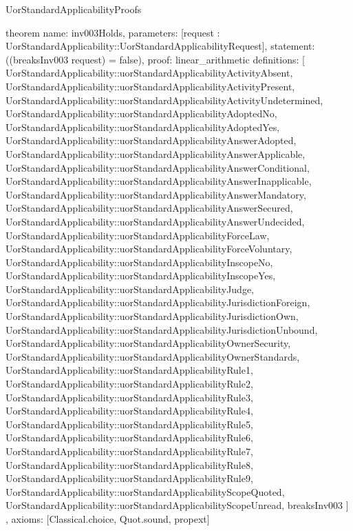 \begin{lexlean}{UorStandardApplicabilityProofs}
\begin{semanticmodule}
theorem{
  name: inv003Holds,
  parameters: [request : UorStandardApplicability::UorStandardApplicabilityRequest],
  statement: ((breaksInv003 request) = false),
  proof: linear_arithmetic{
    definitions: [
      UorStandardApplicability::uorStandardApplicabilityActivityAbsent,
      UorStandardApplicability::uorStandardApplicabilityActivityPresent,
      UorStandardApplicability::uorStandardApplicabilityActivityUndetermined,
      UorStandardApplicability::uorStandardApplicabilityAdoptedNo,
      UorStandardApplicability::uorStandardApplicabilityAdoptedYes,
      UorStandardApplicability::uorStandardApplicabilityAnswerAdopted,
      UorStandardApplicability::uorStandardApplicabilityAnswerApplicable,
      UorStandardApplicability::uorStandardApplicabilityAnswerConditional,
      UorStandardApplicability::uorStandardApplicabilityAnswerInapplicable,
      UorStandardApplicability::uorStandardApplicabilityAnswerMandatory,
      UorStandardApplicability::uorStandardApplicabilityAnswerSecured,
      UorStandardApplicability::uorStandardApplicabilityAnswerUndecided,
      UorStandardApplicability::uorStandardApplicabilityForceLaw,
      UorStandardApplicability::uorStandardApplicabilityForceVoluntary,
      UorStandardApplicability::uorStandardApplicabilityInscopeNo,
      UorStandardApplicability::uorStandardApplicabilityInscopeYes,
      UorStandardApplicability::uorStandardApplicabilityJudge,
      UorStandardApplicability::uorStandardApplicabilityJurisdictionForeign,
      UorStandardApplicability::uorStandardApplicabilityJurisdictionOwn,
      UorStandardApplicability::uorStandardApplicabilityJurisdictionUnbound,
      UorStandardApplicability::uorStandardApplicabilityOwnerSecurity,
      UorStandardApplicability::uorStandardApplicabilityOwnerStandards,
      UorStandardApplicability::uorStandardApplicabilityRule1,
      UorStandardApplicability::uorStandardApplicabilityRule2,
      UorStandardApplicability::uorStandardApplicabilityRule3,
      UorStandardApplicability::uorStandardApplicabilityRule4,
      UorStandardApplicability::uorStandardApplicabilityRule5,
      UorStandardApplicability::uorStandardApplicabilityRule6,
      UorStandardApplicability::uorStandardApplicabilityRule7,
      UorStandardApplicability::uorStandardApplicabilityRule8,
      UorStandardApplicability::uorStandardApplicabilityRule9,
      UorStandardApplicability::uorStandardApplicabilityScopeQuoted,
      UorStandardApplicability::uorStandardApplicabilityScopeUnread,
      breaksInv003
    ]
  },
  axioms: [Classical.choice, Quot.sound, propext]
}


\end{semanticmodule}
\end{lexlean}

